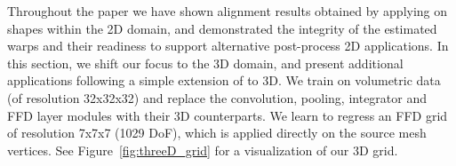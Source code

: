 \documentclass[acmtog,timestamp]{acmart}%
\newcommand{\jsubfig}[2]{%
	\sbox\jsavebox{#1}%
	\parbox[t]{\wd\jsavebox}{\centering\usebox\jsavebox\\#2}%
	}
\begin{document}
\begin{comment}
   \jsubfig{\texttt{[image: \{figures/stress\_test/vase/sample001\_source.png]}}}{} \;
   \hfill \jsubfig{\texttt{[image: figures/stress\_test/vase/sample013\_targetPred.png]}} \; %
   \hfill \jsubfig{\texttt{[image: figures/stress\_test/vase/sample002\_targetPred.png]}} \; %
   \hfill \jsubfig{\texttt{[image: figures/stress\_test/vase/sample003\_targetPred.png]}} \; %
   \hfill \jsubfig{\texttt{[image: figures/stress\_test/vase/sample004\_targetPred.png]}} \; %
   \hfill \jsubfig{\texttt{[image: figures/stress\_test/vase/sample005\_targetPred.png]}} \; %
   \hfill \jsubfig{\texttt{[image: figures/stress\_test/vase/sample006\_targetPred.png]}} \; %
   \hfill \jsubfig{\texttt{[image: figures/stress\_test/vase/sample007\_targetPred.png]}} \; %
   \hfill \jsubfig{\texttt{[image: figures/stress\_test/vase/sample009\_targetPred.png]}} \; %
   \hfill \jsubfig{\texttt{[image: figures/stress\_test/vase/sample010\_targetPred.png]}} \; %
   
   \\
\jsubfig{\texttt{[image: \{figures/novel\_class/line.png]}}}{}%
\\
\end{comment}%
Throughout the paper we have shown alignment results obtained by applying \ourmethod{} on shapes within the 2D domain, and demonstrated the integrity of the estimated warps and their readiness to support alternative post-process 2D applications.
%
In this section, we shift our focus to the 3D domain, and present additional applications following a simple extension of \ourmethod{} to 3D. We train on volumetric data (of resolution 32x32x32) and replace the convolution, pooling, integrator and FFD layer modules with their 3D counterparts. We learn to regress an FFD grid of resolution 7x7x7 (1029 DoF), which is applied directly on the source mesh vertices.  See Figure~\ref{fig:threeD_grid} for a visualization of our 3D grid.
\end{document}

